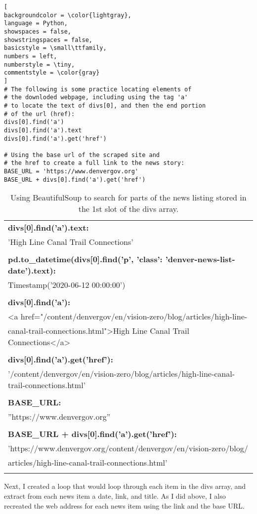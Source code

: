 \documentclass[]{article}
\begin{document}
\begin{lstlisting}[
backgroundcolor = \color{lightgray},
language = Python,
showspaces = false,
showstringspaces = false,
basicstyle = \small\ttfamily,
numbers = left,
numberstyle = \tiny,
commentstyle = \color{gray}
]
# The following is some practice locating elements of
# the downloded webpage, including using the tag 'a'
# to locate the text of divs[0], and then the end portion
# of the url (href):
divs[0].find('a')
divs[0].find('a').text
divs[0].find('a').get('href')

# Using the base url of the scraped site and
# the href to create a full link to the news story:
BASE_URL = 'https://www.denvergov.org'
BASE_URL + divs[0].find('a').get('href')

\end{lstlisting}

\begin{table}[!ht]
	\begin{center}
		\caption{Using BeautifulSoup to search for parts of the news listing stored in the 1st slot of the divs array.}
		\label{tab:table1}
		\begin{tabular}{|l|} 

			\hline
			\textbf{divs[0].find('a').text:}\\
			'High Line Canal Trail Connections'\\
			\\
			\hline
			\textbf{pd.to\_datetime(divs[0].find('p', {'class': 'denver-news-list-date'}).text):}\\
			Timestamp('2020-06-12 00:00:00')\\
			\\
			\hline
			\textbf{divs[0].find('a'):}\\
		<a  href="/content/denvergov/en/vision-zero/blog/articles/high-line-\\
		canal-trail-connections.html">High Line Canal Trail Connections</a>\\
		\\
			\hline
			\textbf{divs[0].find('a').get('href'):}\\
			'/content/denvergov/en/vision-zero/blog/articles/high-line-canal-trail-connections.html'\\
			\\
			\hline
			\textbf{BASE\_URL:}\\
			''https://www.denvergov.org''\\
			\\
			\hline
			\textbf{BASE\_URL + divs[0].find('a').get('href'):}\\
			'https://www.denvergov.org/content/denvergov/en/vision-zero/blog/\\
			articles/high-line-canal-trail-connections.html'\\
			\\
			\hline
		\end{tabular}
	\end{center}
\end{table}
Next, I created a loop that would loop through each item in the divs array, and extract from each news item a date, link, and title.  As I did above, I also recreated the web address for each news item using the link and the base URL.
\end{document}
